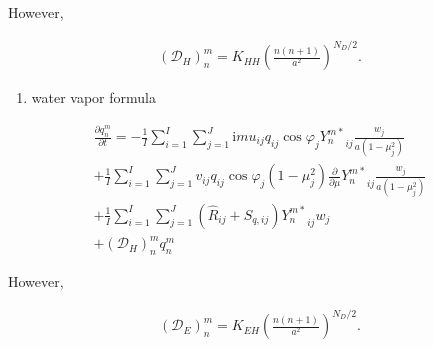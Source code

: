 However,

\begin{eqnarray}
({\mathcal D}_H)_n^m 
   =  K_{HH} \left( \frac{n(n+1)}{a^{2}} \right)^{N_D/2} .
\end{eqnarray}

\begin{enumerate}
\def\labelenumi{\arabic{enumi}.}
\setcounter{enumi}{3}
\tightlist
\item
  water vapor formula
\end{enumerate}

\begin{eqnarray}
  \frac{\partial{q_n^m}}{\partial {t}}
   =  - \frac{1}{I} \sum_{i=1}^{I} \sum_{j=1}^{J}  
          \mathrm{i}m u_{ij} q_{ij} \cos\varphi_j
          {Y_n^{m *}}_{ij} \frac{w_j}{a(1-\mu_j^{2})} 
          \\
     + \frac{1}{I} \sum_{i=1}^{I} \sum_{j=1}^{J}  
          v_{ij} q_{ij} \cos\varphi_j
          (1-\mu_j^2) 
          \frac{\partial }{\partial \mu} {Y_n^{m *}}_{ij}
          \frac{w_j}{a(1-\mu_j^{2})} 
          \\
     + \frac{1}{I} \sum_{i=1}^{I} \sum_{j=1}^{J}  
          \left( \hat{R}_{ij} + S_{q,ij} \right)
          {Y_n^{m *}}_{ij} w_j
          \\ 
     + ({\mathcal D}_H)_n^m q_n^m
\end{eqnarray}

However,

\begin{eqnarray}
({\mathcal D}_E)_n^m 
   =  K_{EH} \left( \frac{n(n+1)}{a^{2}} \right)^{N_D/2} .
\end{eqnarray}
